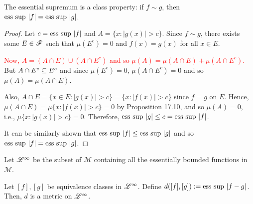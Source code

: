 \begin{proposition}
    The essential supremum is a class property: if $f \sim g$, then $ \text{ess sup } |f| = \text{ess sup } |g|$.
\end{proposition}

\begin{proof}
    Let $c = \text{ess sup } |f|$ and $A = \{ x : |g(x)| > c \}$. Since $f \sim g$, there exists some $E \in \mathscr{F}$ such that $\mu(E^c) = 0$ and $f(x) = g(x)$ for all $x \in E$.

    \textcolor{red}{Now, $ A = (A \cap E) \cup (A \cap E^c) $ and so $\mu(A) = \mu(A \cap E) + \mu(A \cap E^c)$.} But $A \cap E^c \subseteq E^c$ and since $\mu(E^c) = 0$, $\mu(A \cap E^c) = 0$ and so $\mu(A) = \mu(A \cap E)$.

    Also, $A \cap E = \{ x \in E : |g(x)| > c \} = \{ x : |f(x)| > c \}$ since $f = g$ on $E$. Hence, $\mu(A \cap E) = \mu \{ x : |f(x)| > c \} = 0$ by Proposition 17.10, and so $\mu(A) = 0$, i.e., $\mu\{ x : |g(x)| > c \} = 0$. Therefore, $\text{ess sup } |g| \leq c = \text{ess sup } |f|$. 
    
    It can be similarly shown that $\text{ess sup } |f| \leq \text{ess sup } |g|$ and so $\text{ess sup } |f| = \text{ess sup } |g|$.
\end{proof}

Let $\mathscr{L}^\infty$ be the subset of $\mathscr{M}$ containing all the essentially bounded functions in $\mathscr{M}$. 

\begin{lemma}
    Let $[f], [g]$ be equivalence classes in $\mathscr{L}^\infty$. Define $d([f], [g]) := \text{ess sup } |f - g|$. Then, $d$ is a metric on $\mathscr{L}^\infty$.
\end{lemma}

